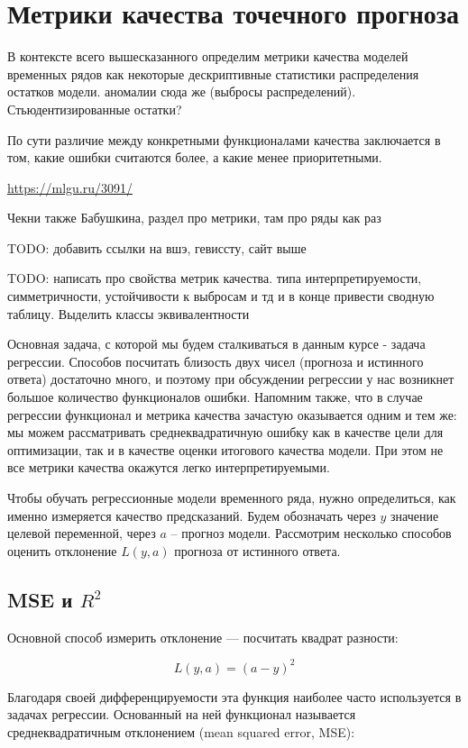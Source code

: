 \section{Метрики качества точечного прогноза}

В контексте всего вышесказанного определим метрики качества моделей
временных рядов как некоторые дескриптивные статистики распределения
остатков модели. аномалии сюда же (выбросы распределений).
Стьюдентизированные остатки?

По сути различие между конкретными функционалами качества заключается
в том, какие ошибки считаются более, а какие менее приоритетными.

\url{https://mlgu.ru/3091/}

Чекни также Бабушкина, раздел про метрики, там про ряды как раз

TODO: добавить ссылки на вшэ, гевиссту, сайт выше

TODO: написать про свойства метрик качества. типа интерпретируемости,
симметричности, устойчивости к выбросам и тд и в конце привести
сводную таблицу. Выделить классы эквивалентности

Основная задача, с которой мы будем сталкиваться в данным курсе -
задача регрессии. Способов посчитать близость двух чисел
(прогноза и истинного ответа) достаточно много, и поэтому при
обсуждении регрессии у нас возникнет большое количество функционалов ошибки.
Напомним также, что в случае регрессии функционал и метрика качества
зачастую оказывается одним и тем же: мы можем рассматривать
среднеквадратичную ошибку как в качестве цели для оптимизации, так
и в качестве оценки итогового качества модели. При этом не все
метрики качества окажутся легко интерпретируемыми.

Чтобы обучать регрессионные модели временного ряда, нужно
определиться, как именно измеряется качество предсказаний. Будем
обозначать через \( y \) значение целевой переменной, через \( a \) --
прогноз модели.
Рассмотрим несколько способов оценить отклонение \( L(y, a) \)
прогноза от истинного ответа.

\subsection*{MSE и \( R^2 \)}
Основной способ измерить отклонение — посчитать квадрат разности:

\[ L(y, a) = (a - y)^2 \]

Благодаря своей дифференцируемости эта функция наиболее часто
используется в задачах регрессии. Основанный на ней функционал
называется среднеквадратичным отклонением (mean squared error, MSE):

